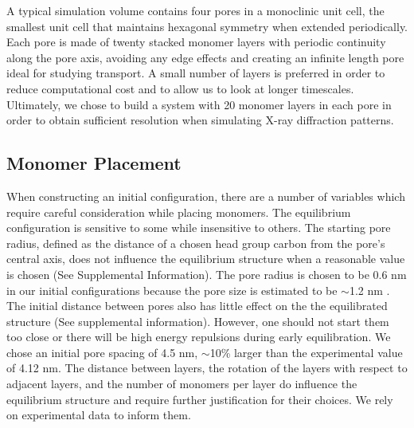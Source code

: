 \documentclass{article}
\begin{document}
  A typical simulation volume contains four pores in a monoclinic unit cell,
  the smallest unit cell that maintains hexagonal symmetry when extended
  periodically. Each pore is made of twenty stacked monomer layers with periodic
  continuity along the pore axis, avoiding any edge effects and creating an
  infinite length pore ideal for studying transport. A small number of layers is
  preferred in order to reduce computational cost and to allow us to look at
  longer timescales. Ultimately, we chose to build a system with 20 monomer
  layers in each pore in order to obtain sufficient resolution when simulating
  X-ray diffraction patterns. %

\subsection{Monomer Placement} 

  When constructing an initial configuration, there are a number of variables
  which require careful consideration while placing monomers. The equilibrium
  configuration is sensitive to some while insensitive to others. The starting
  pore radius, defined as the distance of a chosen head group carbon from the
  pore's central axis, does not influence the equilibrium structure when a
  reasonable value is chosen (See Supplemental Information). The pore radius is
  chosen to be 0.6 nm in our initial configurations because the pore size is
  estimated to be $\sim$1.2 nm \cite{zhou_supported_2005}. The initial distance
  between pores also has little effect on the the equilibrated structure (See
  supplemental information). However, one should not start them too close or
  there will be high energy repulsions during early equilibration. We chose an
  initial pore spacing of 4.5 nm, $\sim$10\% larger than the experimental value
  of 4.12 nm.  The distance between layers, the rotation of the layers with
  respect to adjacent layers, and the number of monomers per layer do influence
  the equilibrium structure and require further justification for their choices.
  We rely on experimental data to inform them. 
\end{document}
